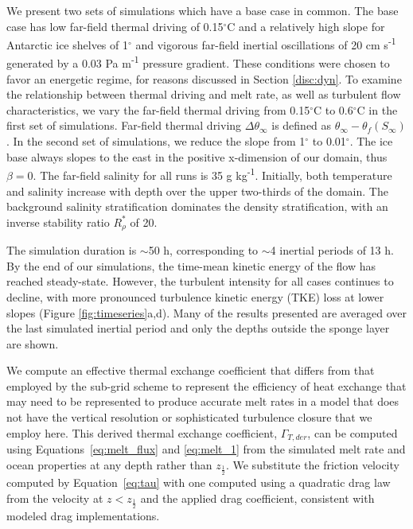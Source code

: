 \documentclass[draft]{agujournal2019}
\begin{document}
We present two sets of simulations which have a base case in common. The base case has low far-field thermal driving of 0.15$^{\circ}$C and a relatively high slope for Antarctic ice shelves of 1$^{\circ}$ and vigorous far-field inertial oscillations of 20 cm s\textsuperscript{-1} generated by a 0.03 Pa m\textsuperscript{-1} pressure gradient. These conditions were chosen to favor an energetic regime, for reasons discussed in Section \ref{disc:dyn}. To examine the relationship between thermal driving and melt rate, as well as turbulent flow characteristics, we vary the far-field thermal driving from 0.15$^{\circ}$C to 0.6$^{\circ}$C in the first set of simulations. Far-field thermal driving $\Delta \theta_\infty$ is defined as $\theta_{\infty} - \theta_f(S_{\infty})$. In the second set of simulations, we reduce the slope from 1$^{\circ}$ to 0.01$^{\circ}$. The ice base always slopes to the east in the positive x-dimension of our domain, thus $\beta = 0$. The far-field salinity for all runs is 35 g kg\textsuperscript{-1}. Initially, both temperature and salinity increase with depth over the upper two-thirds of the domain. The background salinity stratification dominates the density stratification, with an inverse stability ratio $R_\rho^*$ of 20. 

The simulation duration is $\sim$50 h, corresponding to $\sim$4 inertial periods of 13 h. By the end of our simulations, the time-mean kinetic energy of the flow has reached steady-state. However, the turbulent intensity for all cases continues to decline, with more pronounced turbulence kinetic energy (TKE) loss at lower slopes (Figure \ref{fig:timeseries}a,d). Many of the results presented are averaged over the last simulated inertial period and only the depths outside the sponge layer are shown.

We compute an effective thermal exchange coefficient that differs from that employed by the sub-grid scheme to represent the efficiency of heat exchange that may need to be represented to produce accurate melt rates in a model that does not have the vertical resolution or sophisticated turbulence closure that we employ here. This derived thermal exchange coefficient, $\Gamma_{T,der}$, can be computed using Equations~\ref{eq:melt_flux} and \ref{eq:melt_1} from the simulated melt rate and ocean properties at any depth rather than $z_{\frac{1}{2}}$. We substitute the friction velocity computed by Equation~\ref{eq:tau} with one computed using a quadratic drag law from the velocity at $z < z_{\frac{1}{2}}$ and the applied drag coefficient, consistent with modeled drag implementations. 
\end{document}
